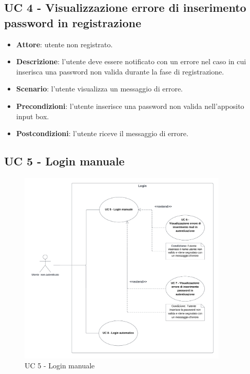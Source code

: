 \subsection{UC 4 - Visualizzazione errore di inserimento password in registrazione}
\begin{itemize}
    \item \textbf{Attore}: utente non registrato.
    \item \textbf{Descrizione}: l’utente deve essere notificato con un errore nel caso in cui inserisca una password non valida durante la fase di registrazione.
    \item \textbf{Scenario}: l’utente visualizza un messaggio di errore.
    \item \textbf{Precondizioni}: l’utente inserisce una password non valida nell'apposito input box.
    \item \textbf{Postcondizioni}: l’utente riceve il messaggio di errore.
\end{itemize}

\subsection{UC 5 - Login manuale}
\begin{figure}[!h]
    \includegraphics[width=10cm]{sezioni/Images/UC5.png}
    \centering
    \caption{UC 5 - Login manuale}
\end{figure}

